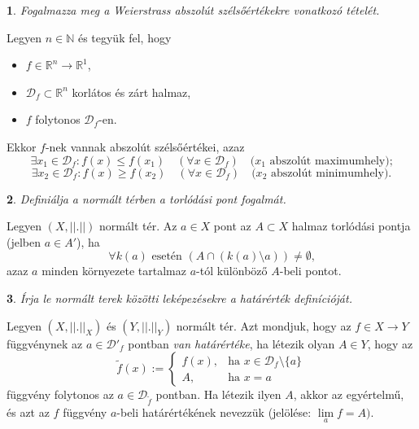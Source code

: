 \documentclass[a4paper]{article}
\def\R{\mathbb{R}}
\def\N{\mathbb{N}}
\theoremstyle{qstyle}
\newtheorem{question}{}{}
\begin{document}
	\begin{question}
		Fogalmazza meg a Weierstrass abszolút szélsőértékekre vonatkozó tételét.   
	\end{question}
	Legyen $n \in \N$ és tegyük fel, hogy
	\begin{itemize}
		\item $f \in \R^{n} \to \R^{1}$,
		\item $\mathcal{D}_{f} \subset \R^{n}$ korlátos és zárt halmaz,
		\item $f$ folytonos $\mathcal{D}_{f}$-en.
	\end{itemize}
	Ekkor $f$-nek vannak abszolút szélsőértékei, azaz
	$$\exists x_{1} \in \mathcal{D}_{f} : f(x) \le f(x_{1}) \quad (\forall x \in \mathcal{D}_{f}) \quad \text{($x_{1}$ abszolút maximumhely);}$$
	$$\exists x_{2} \in \mathcal{D}_{f} : f(x) \ge f(x_{2}) \quad (\forall x \in \mathcal{D}_{f}) \quad \text{($x_{2}$ abszolút minimumhely).}$$
	
	\begin{question}
		Definiálja a normált térben a torlódási pont fogalmát.  
	\end{question}
	Legyen $(X, ||.||)$ normált tér. Az $a \in X$ pont az $A \subset X$ halmaz torlódási pontja (jelben $a \in A'$), ha
	$$\forall k(a) \text{ esetén } (A \cap (k(a) \setminus {a})) \ne \emptyset \text{,}$$
	azaz $a$ minden környezete tartalmaz $a$-tól különböző $A$-beli pontot.
	
	\newpage
	
	\begin{question}
		Írja le normált terek közötti leképezésekre a határérték definícióját. 
	\end{question}
	Legyen $(X, ||.||_{X})$ és $(Y, ||.||_{Y})$ normált tér. Azt mondjuk, hogy az $f \in X \to Y$ függvénynek az $a \in \mathcal{D}'_{f}$ pontban \emph{van határértéke}, ha létezik olyan $A \in Y$, hogy az
	$$\widetilde{f}(x) := \begin{cases}
	f(x),& \text{ha } x \in \mathcal{D}_{f} \setminus \{a\}\\
	A,              & \text{ha } x = a
	\end{cases}$$
	függvény folytonos az $a \in \mathcal{D}_{\widetilde{f}}$ pontban. Ha létezik ilyen $A$, akkor az egyértelmű, és azt az $f$ függvény $a$-beli határértékének nevezzük (jelölése: $\lim\limits_{a} f = A)$.
	
\end{document}
